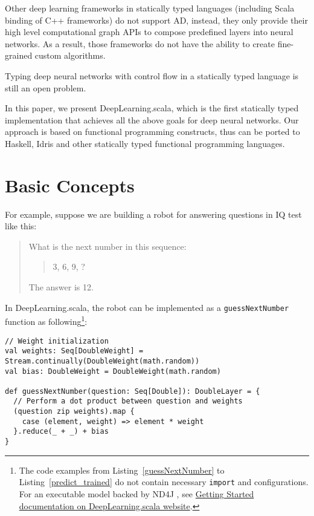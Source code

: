 Other deep learning frameworks in statically typed languages (including Scala binding of C++ frameworks) \cite{intel2016bigdl,skymind2017deeplearning4j,baydin2016hype,chen2017typesafe,zhao2017deepdsl} do not support AD, instead, they only provide their high level \gls{computational graph} APIs to compose predefined layers into neural networks. As a result, those frameworks do not have the ability to create fine-grained custom algorithms.

Typing deep neural networks with control flow in a statically typed language is still an open problem.

In this paper, we present DeepLearning.scala, which is the first statically typed implementation that achieves all the above goals for deep neural networks. Our approach is based on functional programming constructs, thus can be ported to Haskell, Idris and other statically typed functional programming languages.

\section{Basic Concepts}
\label{concepts}

For example, suppose we are building a robot for answering questions in IQ test like this:

\begin{quote}
  What is the next number in this sequence:
    \begin{quote}
    3, 6, 9, ?
    \end{quote}
  The answer is 12.
\end{quote}

In DeepLearning.scala, the robot can be implemented as a \lstinline{guessNextNumber} function as following\footnote{The code examples from Listing~\ref{guessNextNumber} to Listing~\ref{predict_trained} do not contain necessary \lstinline{import} and configurations. For an executable model backed by ND4J \cite{skymind2017nd4j}, see \href{http://deeplearning.thoughtworks.school/demo/GettingStarted.html}{Getting Started documentation on DeepLearning.scala website}.}:

\begin{lstlisting}[float={h t b p},caption={The differentiable matrix multiplication implemented by \lstinline{map}/\lstinline{reduce}},label={guessNextNumber}]
// Weight initialization
val weights: Seq[DoubleWeight] = Stream.continually(DoubleWeight(math.random))
val bias: DoubleWeight = DoubleWeight(math.random)

def guessNextNumber(question: Seq[Double]): DoubleLayer = {
  // Perform a dot product between question and weights
  (question zip weights).map {
    case (element, weight) => element * weight
  }.reduce(_ + _) + bias
}
\end{lstlisting}

